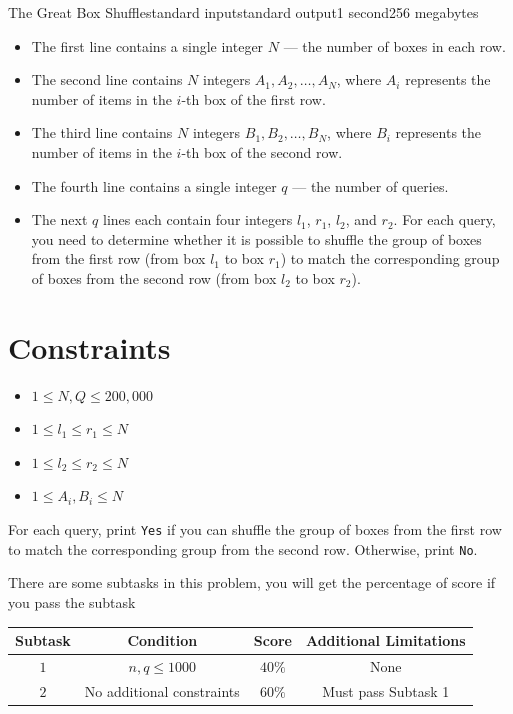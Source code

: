 \begin{problem}{The Great Box Shuffle}{standard input}{standard output}{1 second}{256 megabytes}
\InputFile
\begin{itemize}
    \item The first line contains a single integer \( N \) --- the number of boxes in each row.
    \item The second line contains \( N \) integers \( A_1, A_2, \dots, A_N \), where \( A_i \) represents the number of items in the \( i \)-th box of the first row.
    \item The third line contains \( N \) integers \( B_1, B_2, \dots, B_N \), where \( B_i \) represents the number of items in the \( i \)-th box of the second row.
    \item The fourth line contains a single integer \( q \) --- the number of queries.
    \item The next \( q \) lines each contain four integers \( l_1 \), \( r_1 \), \( l_2 \), and \( r_2 \). For each query, you need to determine whether it is possible to shuffle the group of boxes from the first row (from box \( l_1 \) to box \( r_1 \)) to match the corresponding group of boxes from the second row (from box \( l_2 \) to box \( r_2 \)).
\end{itemize}

\section*{Constraints}

\begin{itemize}
    \item \( 1 \leq N, Q \leq 200,000 \)
    \item \( 1 \leq l_1 \leq r_1 \leq N \)
    \item \( 1 \leq l_2 \leq r_2 \leq N \)
    \item \( 1 \leq A_i, B_i \leq N \)
\end{itemize}

\OutputFile
For each query, print \texttt{Yes} if you can shuffle the group of boxes from the first row to match the corresponding group from the second row. Otherwise, print \texttt{No}.

\Scoring
There are some subtasks in this problem, you will get the percentage of score if you pass the subtask

\begin{center}
  \begin{tabular}{ | c | c | c | c | } \hline
    \bf{Subtask} &
    \bf{Condition} &
    \bf{Score} &
    \bf{Additional Limitations} \\ \hline
    $1$ & $n,q \le 1000$ & $40\%$ & None \\ \hline
    $2$ & No additional constraints & $60\%$ & Must pass Subtask 1 \\ \hline
    \end{tabular}
\end{center}


\end{problem}
